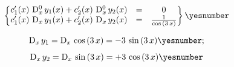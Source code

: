 \documentclass["AM3C-Slides_annotations.tex"]{subfiles}
\begin{document}
\begin{exampleBox}
  \begin{gather*}
    \begin{Bmatrix}
      {
        c_1'(x)\,\mdif[0]{x}\,y_1(x) 
        + c_2'(x)\,\mdif[0]{x}\,y_2(x)
      } &=& 0
      \\ {
        c_1'(x)\,\mdif[1]{x}\,y_1(x) 
        + c_2'(x)\,\mdif[1]{x}\,y_2(x)
      } &=& \frac{1}{\cos{(3\,x)}}
    \end{Bmatrix}
    \yesnumber\label{eq:e.14.2 eq_sytem}
  \end{gather*}

  \begin{gather*}
    \mdif[1]{x}\,y_1
    = \mdif[1]{x}\,\cos{(3\,x)}
    = -3\,\sin{(3\,x)}
    \yesnumber\label{eq:e.14.2 D_x(y_1)}
    ; \\[1ex]
    \mdif[1]{x}\,y_2
    = \mdif[1]{x}\,\sin{(3\,x)}
    = +3\,\cos{(3\,x)}
    \yesnumber\label{eq:e.14.2 D_x(y_2)}
  \end{gather*}

\end{exampleBox}
\end{document}
